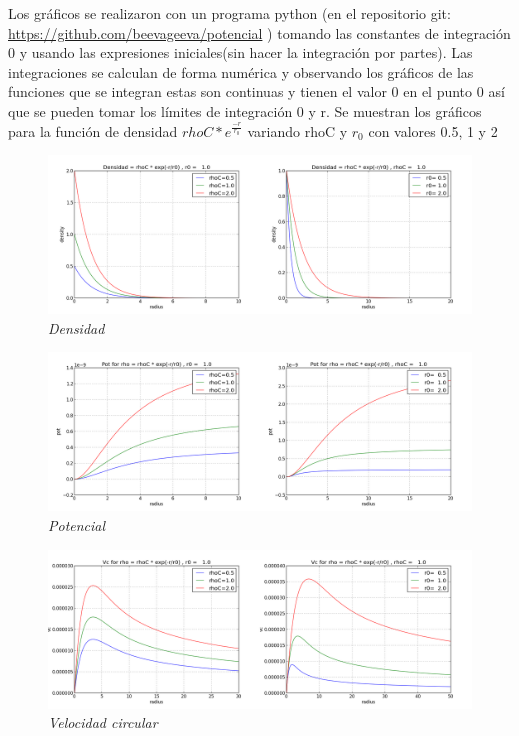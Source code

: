 \documentclass[12pt]{book}
\begin{document}
\begin{description}
\item Los gráficos se realizaron con un programa python (en el repositorio git: \url{https://github.com/beevageeva/potencial} ) tomando las constantes de integración 0 y usando las expresiones iniciales(sin hacer la integración por partes). 
Las integraciones se calculan de forma numérica y observando los gráficos de las funciones que se integran estas son continuas y tienen el valor 0 en el punto 0 así que se pueden tomar los límites de integración 0 y r.
Se muestran los gráficos para la función de densidad $ rhoC * e^{\frac{-r}{r_0} }$ variando rhoC y $r_0$ con valores 0.5, 1 y 2


\item

\begin{figure}[!ht]
 \centering
 \includegraphics[scale=0.33]{densFinal.png}
 \caption{\emph{Densidad}}
\end{figure}

\item

\begin{figure}[!ht]
 \centering
 \includegraphics[scale=0.33]{potFinal.png}
 \caption{\emph{Potencial}}
\end{figure}

\item

\begin{figure}[!ht]
 \centering
 \includegraphics[scale=0.33]{vcFinal.png}
 \caption{\emph{Velocidad circular}}
\end{figure}


\end{description}
\end{document}
